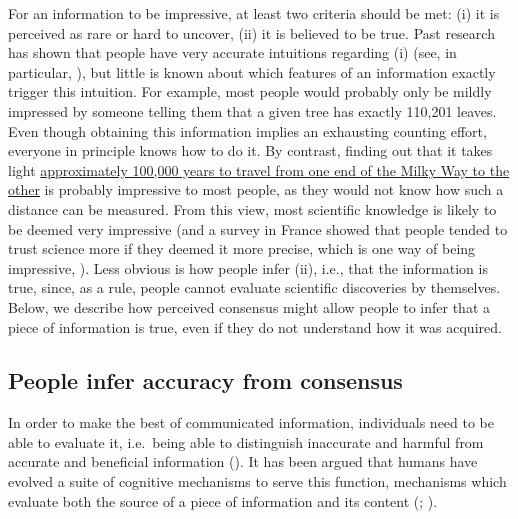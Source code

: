 \documentclass[
  man,
  floatsintext,
  longtable,
  nolmodern,
  notxfonts,
  notimes,
  colorlinks=true,linkcolor=blue,citecolor=blue,urlcolor=blue]{apa7}
\begin{document}
For an information to be impressive, at least two criteria should be
met: (i) it is perceived as rare or hard to uncover, (ii) it is believed
to be true. Past research has shown that people have very accurate
intuitions regarding (i) (see, in particular,
),
but little is known about which features of an information exactly
trigger this intuition. For example, most people would probably only be
mildly impressed by someone telling them that a given tree has exactly
110,201 leaves. Even though obtaining this information implies an
exhausting counting effort, everyone in principle knows how to do it. By
contrast, finding out that it takes light
\href{https://imagine.gsfc.nasa.gov/features/cosmic/milkyway_info.html}{approximately
100,000 years to travel from one end of the Milky Way to the other} is
probably impressive to most people, as they would not know how such a
distance can be measured. From this view, most scientific knowledge is
likely to be deemed very impressive (and a survey in France showed that
people tended to trust science more if they deemed it more precise,
which is one way of being impressive,
).
Less obvious is how people infer (ii), i.e., that the information is
true, since, as a rule, people cannot evaluate scientific discoveries by
themselves. Below, we describe how perceived consensus might allow
people to infer that a piece of information is true, even if they do not
understand how it was acquired.

\subsection{People infer accuracy from
consensus}\label{people-infer-accuracy-from-consensus}

In order to make the best of communicated information, individuals need
to be able to evaluate it, i.e.~being able to distinguish inaccurate and
harmful from accurate and beneficial information
(). It has been argued that humans have evolved a suite of cognitive
mechanisms to serve this function, mechanisms which evaluate both the
source of a piece of information and its content
(;
).
\end{document}
